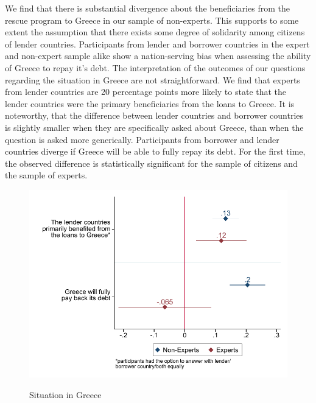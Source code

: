We find that there is substantial divergence about the beneficiaries from the rescue program to Greece in our sample of non-experts. This supports to some 
extent the assumption that there exists some degree of solidarity among citizens of lender countries. 
Participants from lender and borrower countries in the expert and non-expert sample alike show a nation-serving bias when assessing the ability of Greece to repay it's debt. 
 \clearpage
 The interpretation of the outcomes of our questions regarding the situation in Greece are not straightforward. We find that experts from  lender countries are 20 percentage points more likely to state that the lender countries were the primary beneficiaries from the loans to Greece. It is noteworthy, that the difference between lender countries and borrower countries is slightly smaller when they are specifically asked about Greece, than when the question is asked more generically. Participants from borrower and lender countries diverge if Greece will be able to fully repay its debt. For the first time, the observed difference is statistically significant for the sample of citizens and the sample of experts.  
 \\
\begin{figure}[h!] 
\begin{center}
     \caption{Situation in Greece}
     \includegraphics[scale=0.8]{Question6_7_base.pdf}
     \label{fig:my_label}
     \end{center}
     \tiny
\end{figure}